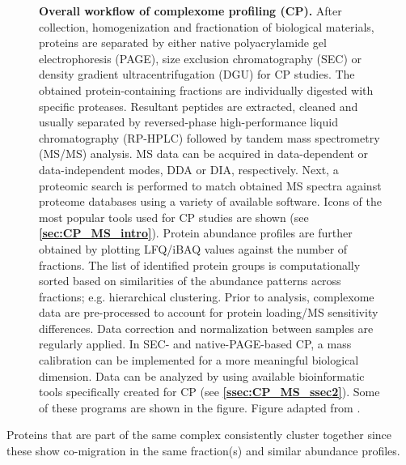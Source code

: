 \begin{figure}[ht!]
    \caption{\textbf{Overall workflow of complexome profiling (CP).} After collection, homogenization and fractionation of biological materials, proteins are separated by either native polyacrylamide gel electrophoresis (PAGE), size exclusion chromatography (SEC) or density gradient ultracentrifugation (DGU) for CP studies. The obtained protein-containing fractions are individually digested with specific proteases. Resultant peptides are extracted, cleaned and usually separated by reversed-phase high-performance liquid chromatography (RP-HPLC) followed by tandem mass spectrometry (MS/MS) analysis. MS data can be acquired in data-dependent or data-independent modes, DDA or DIA, respectively. Next, a proteomic search is performed to match obtained MS spectra against proteome databases using a variety of available software. Icons of the most popular tools used for CP studies are shown (see \textbf{\autoref{sec:CP_MS_intro}}). Protein abundance profiles are further obtained by plotting LFQ/iBAQ values against the number of fractions. The list of identified protein groups is computationally sorted based on similarities of the abundance patterns across fractions; e.g. hierarchical clustering. Prior to analysis, complexome data are pre-processed to account for protein loading/MS sensitivity differences. Data correction and normalization between samples are regularly applied. In SEC- and native-PAGE-based CP, a mass calibration can be implemented for a more meaningful biological dimension. Data can be analyzed by using available bioinformatic tools specifically created for CP (see \textbf{\autoref{ssec:CP_MS_ssec2}}). Some of these programs are shown in the figure. Figure adapted from \cite{Cabrera-Orefice_2022}.}
\end{figure}
Proteins that are part of the same complex consistently cluster together since these show co-migration in the same fraction(s) and similar abundance profiles.
%
